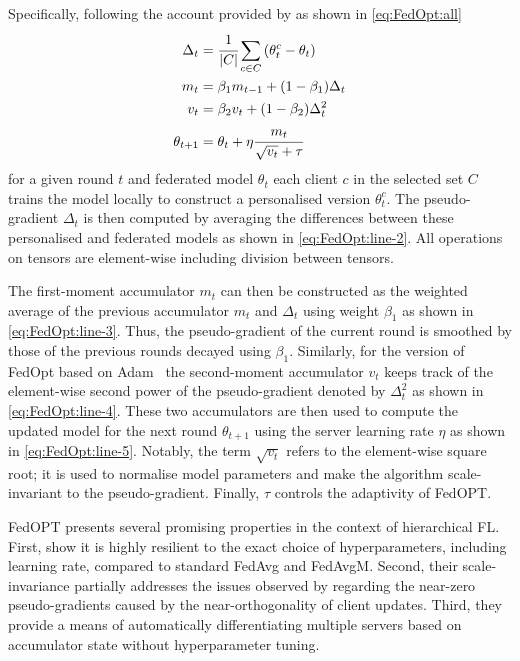 Specifically, following the account provided by \citet{FedOPT} as shown in \cref{eq:FedOpt:all}
\begin{subequations}
    \begin{align}
        \Delta_t     & = \cfrac{1}{|C|} \sum_{c \in C} \left( \theta_t^c - \theta_t \right) \label{eq:FedOpt:line-2} \\
        m_t          & = \beta_1 m_{t-1} + (1-\beta_1) \Delta_t \label{eq:FedOpt:line-3}                             \\
        v_t          & = \beta_2 v_t + (1-\beta_2) \Delta_t^2 \label{eq:FedOpt:line-4}                               \\
        \theta_{t+1} & = \theta_t + \eta \cfrac{m_t}{\sqrt{v_t} + \tau} \label{eq:FedOpt:line-5}
    \end{align}
    \label{eq:FedOpt:all}
\end{subequations}
for a given round $t$ and federated model $\theta_t$  each client $c$ in the selected set $C$ trains the model locally to construct a personalised version $\theta_t^c$. The pseudo-gradient $\Delta_t$ is then computed by averaging the differences between these personalised and federated models as shown in \cref{eq:FedOpt:line-2}. All operations on tensors are element-wise including division between tensors.

The first-moment accumulator $m_t$ can then be constructed as the weighted average of the previous accumulator $m_t$ and $\Delta_t$ using weight $\beta_1$ as shown in \cref{eq:FedOpt:line-3}. Thus, the pseudo-gradient of the current round is smoothed by those of the previous rounds decayed using $\beta_1$. Similarly, for the version of FedOpt based on Adam~\citep{Adam} the second-moment accumulator $v_t$  keeps track of the element-wise second power of the pseudo-gradient denoted by $\Delta_t^2$ as shown in \cref{eq:FedOpt:line-4}. These two accumulators are then used to compute the updated model for the next round $\theta_{t+1}$ using the server learning rate $\eta$ as shown in \cref{eq:FedOpt:line-5}. Notably, the term $\sqrt{v_t}$ refers to the element-wise square root; it is used to normalise model parameters and make the algorithm scale-invariant to the pseudo-gradient. Finally, $\tau$ controls the adaptivity of FedOPT\@.

FedOPT presents several promising properties in the context of hierarchical FL\@. First, \citet{FedOPT} show it is highly resilient to the exact choice of hyperparameters, including learning rate, compared to standard FedAvg and FedAvgM. Second, their scale-invariance partially addresses the issues observed by \citet{LargeCohorts} regarding the near-zero pseudo-gradients caused by the near-orthogonality of client updates. Third, they provide a means of automatically differentiating multiple servers based on accumulator state without hyperparameter tuning.

